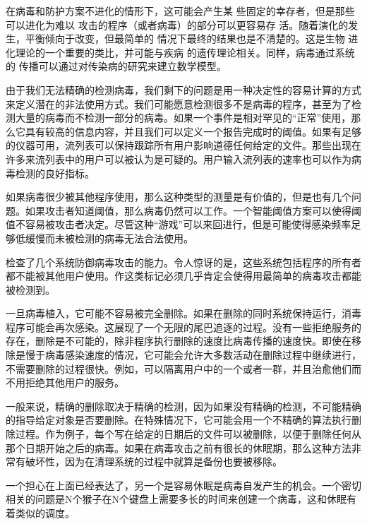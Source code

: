 在病毒和防护方案不进化的情形下，这可能会产生某
些固定的幸存者，但是那些可以进化为难以
攻击的程序（或者病毒）的部分可以更容易存
活。随着演化的发生，平衡倾向于改变，但最简单的
情况下最终的结果也是不清楚的。这是生物
进化理论的一个重要的类比，并可能与疾病
的遗传理论相关。同样，病毒通过系统的
传播可以通过对传染病的研究来建立数学模型。


由于我们无法精确的检测病毒，我们剩下的问题是用一种决定性的容易计算的方式来定义潜在的非法使用方式。我们可能愿意检测很多不是病毒的程序，甚至为了检测大量的病毒而不检测一部分的病毒。如果一个事件是相对罕见的“正常”使用，那么它具有较高的信息内容，并且我们可以定义一个报告完成时的阈值。如果有足够的仪器可用，流列表可以保持跟踪所有用户影响道德任何给定的文件。那些出现在许多来流列表中的用户可以被认为是可疑的。用户输入流列表的速率也可以作为病毒检测的良好指标。

如果病毒很少被其他程序使用，那么这种类型的测量是有价值的，但是也有几个问题。如果攻击者知道阈值，那么病毒仍然可以工作。一个智能阈值方案可以使得阈值不容易被攻击者决定。尽管这种“游戏”可以来回进行，但是可能使得感染频率足够低缓慢而未被检测的病毒无法合法使用。

检查了几个系统防御病毒攻击的能力。令人惊讶的是，这些系统包括程序的所有者都不能被其他用户使用。作这类标记必须几乎肯定会使得用最简单的病毒攻击都能被检测到。

一旦病毒植入，它可能不容易被完全删除。如果在删除的同时系统保持运行，消毒程序可能会再次感染。这展现了一个无限的尾巴追逐的过程。没有一些拒绝服务的存在，删除是不可能的，除非程序执行删除的速度比病毒传播的速度快。即使在移除是慢于病毒感染速度的情况，它可能会允许大多数活动在删除过程中继续进行，不需要删除的过程很快。例如，可以隔离用户中的一个或者一群，并且治愈他们而不用拒绝其他用户的服务。

一般来说，精确的删除取决于精确的检测，因为如果没有精确的检测，不可能精确的指导给定对象是否要删除。在特殊情况下，它可能会用一个不精确的算法执行删除过程。作为例子，每个写在给定的日期后的文件可以被删除，以便于删除任何从那个日期开始之后的病毒。如果在病毒攻击之前有很长的休眠期，那么这种方法非常有破坏性，因为在清理系统的过程中就算是备份也要被移除。

一个担心在上面已经表达了，另一个是容易休眠是病毒自发产生的机会。一个密切相关的问题是N个猴子在N个键盘上需要多长的时间来创建一个病毒，这和休眠有着类似的调度。


